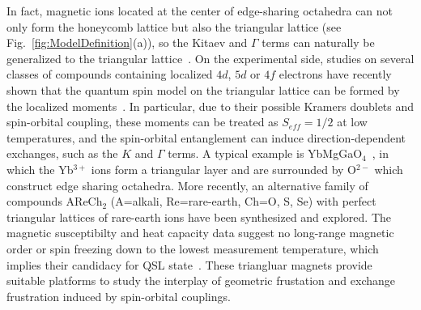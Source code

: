 \documentclass[aps,prb,reprint,amsfonts,amsmath,amssymb,showpacs,groupedaddress,superscriptaddress]{revtex4-1}
\begin{document}
In fact, magnetic ions located at the center of edge-sharing octahedra can not only form the honeycomb lattice but also the triangular lattice (see Fig.~\ref{fig:ModelDefinition}(a)), so the Kitaev and $\Gamma$ terms can naturally be generalized to the triangular lattice~\cite{PhysRevB.89.014414,PhysRevB.93.104417}. On the experimental side, studies on several classes of  compounds containing localized $4d$, $5d$ or $4f$ electrons have recently shown that the quantum spin model on the triangular lattice can be formed by the localized moments~\cite{PhysRevB.86.140405,PhysRevB.94.174410,srep16419,PhysRevLett.115.167203,PhysRevLett.120.087201}. In particular, due to their possible Kramers doublets and spin-orbital coupling, these moments can be treated as $S_{eff}=1/2$ at low temperatures, and the spin-orbital entanglement can induce direction-dependent exchanges, such as the $K$ and $\Gamma$ terms. A typical example is YbMgGaO$_{4}$~\cite{srep16419,PhysRevLett.115.167203}, in which the Yb$^{3+}$ ions form a triangular layer and are surrounded by O$^{2-}$ which construct edge sharing octahedra. More recently, an alternative family of compounds AReCh$_2$ (A=alkali, Re=rare-earth, Ch=O, S, Se) with perfect triangular lattices of rare-earth ions have been synthesized and explored. The magnetic susceptibilty and heat capacity data suggest no long-range magnetic order or spin freezing down to the lowest measurement temperature, which implies their candidacy for QSL state~\cite{acsmaterialslett.9b00464,PhysRevMaterials.3.114413,PhysRevB.100.241116,Liu_2018,PhysRevB.99.180401,PhysRevB.100.224417,PhysRevB.100.144432}. These triangluar magnets provide suitable platforms to study the interplay of geometric frustation and exchange frustration induced by spin-orbital couplings.
\end{document}
